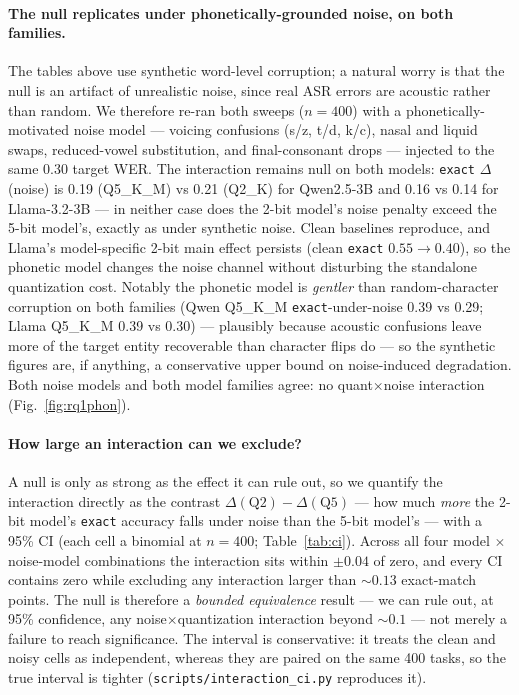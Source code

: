 \documentclass[11pt]{article}
\newcommand{\code}[1]{\texttt{#1}}
\begin{document}
\paragraph{The null replicates under phonetically-grounded noise, on both families.}
The tables above use synthetic word-level corruption; a natural worry is that the null
is an artifact of unrealistic noise, since real ASR errors are acoustic rather than
random. We therefore re-ran both sweeps ($n{=}400$) with a phonetically-motivated noise
model --- voicing confusions (s/z, t/d, k/c), nasal and liquid swaps, reduced-vowel
substitution, and final-consonant drops --- injected to the same 0.30 target WER. The
interaction remains null on both models: \code{exact} $\Delta$(noise) is 0.19
(Q5\_K\_M) vs 0.21 (Q2\_K) for Qwen2.5-3B and 0.16 vs 0.14 for Llama-3.2-3B --- in
neither case does the 2-bit model's noise penalty exceed the 5-bit model's, exactly as
under synthetic noise. Clean baselines reproduce, and Llama's model-specific 2-bit main
effect persists (clean \code{exact} $0.55{\rightarrow}0.40$), so the phonetic model
changes the noise channel without disturbing the standalone quantization cost. Notably
the phonetic model is \emph{gentler} than random-character corruption on both families
(Qwen Q5\_K\_M \code{exact}-under-noise 0.39 vs 0.29; Llama Q5\_K\_M 0.39 vs 0.30) ---
plausibly because acoustic confusions leave more of the target entity recoverable than
character flips do --- so the synthetic figures are, if anything, a conservative upper
bound on noise-induced degradation. Both noise models and both model families agree: no
quant$\times$noise interaction (Fig.~\ref{fig:rq1phon}).

\paragraph{How large an interaction can we exclude?} A null is only as strong as the
effect it can rule out, so we quantify the interaction directly as the contrast
$\Delta(\mathrm{Q2}) - \Delta(\mathrm{Q5})$ --- how much \emph{more} the 2-bit model's
\code{exact} accuracy falls under noise than the 5-bit model's --- with a 95\% CI (each
cell a binomial at $n{=}400$; Table~\ref{tab:ci}). Across all four model $\times$
noise-model combinations the interaction sits within $\pm0.04$ of zero, and every CI
contains zero while excluding any interaction larger than ${\sim}0.13$ exact-match
points. The null is therefore a \emph{bounded equivalence} result --- we can rule out,
at 95\% confidence, any noise$\times$quantization interaction beyond ${\sim}0.1$ ---
not merely a failure to reach significance. The interval is conservative: it treats the
clean and noisy cells as independent, whereas they are paired on the same 400 tasks, so
the true interval is tighter (\code{scripts/interaction\_ci.py} reproduces it).
\end{document}
